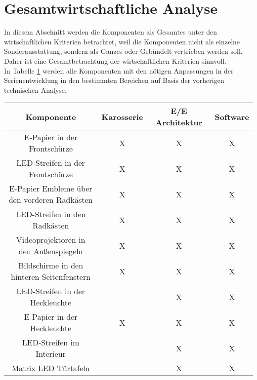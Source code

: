 \section{Gesamtwirtschaftliche Analyse}
In diesem Abschnitt werden die Komponenten als Gesamtes unter den wirtschaftlichen Kriterien betrachtet, weil die Komponenten nicht als einzelne Sonderausstattung, sondern als Ganzes oder Gebündelt vertrieben werden soll. Daher ist eine Gesamtbetrachtung der wirtschaftlichen Kriterien sinnvoll. \\
In Tabelle \ref{tab:Entwicklung} werden alle Komponenten mit den nötigen Anpassungen in der Serienentwicklung in den bestimmten Bereichen auf Basis der vorherigen technischen Analyse. 
\begin{table}[hbt]	
	\centering
	\renewcommand{\arraystretch}{1.5}	%
	\label{tab:Entwicklung}
	\begin{tabular}{c|ccc}
		\textbf{Komponente} & \textbf{Karosserie} & \textbf{E/E Architektur} & \textbf{Software} \\ 
		\hline 
		\hline 
		\parbox[t]{0.4\linewidth}{\centering E-Papier in der Frontschürze} & X & X & X \\
		\parbox[t]{0.4\linewidth}{\centering LED-Streifen in der Frontschürze} & X & X & X \\
		\parbox[t]{0.4\linewidth}{\centering E-Papier Embleme über\\den vorderen Radkästen} & X & X & X \\
		\parbox[t]{0.4\linewidth}{\centering LED-Streifen in den Radkästen} & X & X & X \\
		\parbox[t]{0.4\linewidth}{\centering Videoprojektoren in\\den Außenspiegeln} & X & X & X \\
		\parbox[t]{0.4\linewidth}{\centering Bildschirme in den\\hinteren Seitenfenstern} & X & X & X \\
		\parbox[t]{0.4\linewidth}{\centering LED-Streifen in der Heckleuchte} &  & X & X \\
		\parbox[t]{0.4\linewidth}{\centering E-Papier in der Heckleuchte} & X & X & X \\
		\parbox[t]{0.4\linewidth}{\centering LED-Streifen im Interieur} &  & X & X \\
		\parbox[t]{0.4\linewidth}{\centering Matrix LED Türtafeln} &  & X & X \\

\end{tabular}
\end{table}
